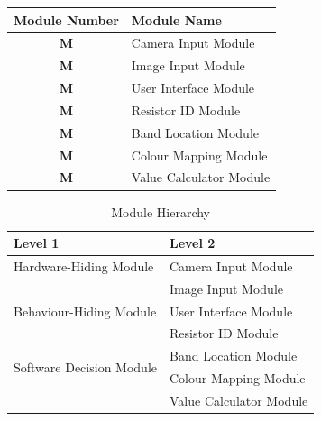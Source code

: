 \documentclass[12pt, titlepage]{article}
\newcounter{mnum}
\newcommand{\mthemnum}{M\themnum}
\begin{document}
\begin{table}[h]
\centering
\label{my-label}
\begin{tabular}{cl}
\hline
\multicolumn{1}{l}{\textbf{Module Number}} & \textbf{Module Name}    \\ \hline
\textbf{{mnum} \mthemnum \label{mCI}}                                & Camera Input Module     \\ \hline
\textbf{{mnum} \mthemnum \label{mII}}                                & Image Input Module      \\ \hline
\textbf{{mnum} \mthemnum \label{mUI}}                                & User Interface Module   \\ \hline
\textbf{{mnum} \mthemnum \label{mRID}}                                & Resistor ID Module      \\ \hline
\textbf{{mnum} \mthemnum \label{mBL}}                                & Band Location Module    \\ \hline
\textbf{{mnum} \mthemnum \label{mCM}}                                & Colour Mapping Module   \\ \hline
\textbf{{mnum} \mthemnum \label{mVC}}                                & Value Calculator Module \\ \hline
\end{tabular}
\end{table}

\begin{table}[h!]
\centering
\begin{tabular}{p{} p{}}
\toprule
\textbf{Level 1} & \textbf{Level 2}\\
\midrule

{Hardware-Hiding Module} 
& Camera Input Module\\
& Image Input Module \\
\midrule

\multirow{1}{0.3\textwidth}{Behaviour-Hiding Module}
& User Interface Module\\
\midrule

\multirow{4}{0.3\textwidth}{Software Decision Module}
& Resistor ID Module \\
& Band Location Module \\
& Colour Mapping Module \\
& Value Calculator Module\\
\bottomrule

\end{tabular}
\caption{Module Hierarchy}
\label{TblMH}
\end{table}
\end{document}
